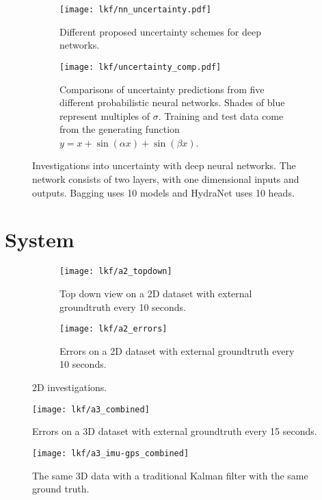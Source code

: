 \begin{figure}
    \centering
    \begin{subfigure}[]{0.9\textwidth}
    \texttt{[image: lkf/nn\_uncertainty.pdf]}
    \caption{Different proposed uncertainty schemes for deep networks.}
    \label{fig:lkf_nn_uncertainty}    
    \end{subfigure}
    
    \begin{subfigure}[]{0.9\textwidth}
    \texttt{[image: lkf/uncertainty\_comp.pdf]}
    \caption{Comparisons of uncertainty predictions from five different probabilistic neural networks. Shades of blue represent multiples of $\sigma$. Training and test data come from the generating function $y = x + \sin{(\alpha x)} + \sin{(\beta x)}$.}
	\end{subfigure}
	\label{fig:lkf_deep-uncertainty}
	\caption{Investigations into uncertainty with deep neural networks. The network consists of two layers, with one dimensional inputs and outputs. Bagging uses 10 models and HydraNet uses 10 heads.}
\end{figure}

\section{System}


\begin{figure}
    \centering
    \begin{subfigure}[]{0.9\textwidth}
    \centering
    \texttt{[image: lkf/a2\_topdown]}
	\caption{Top down view on a 2D dataset with external groundtruth every 10 seconds.}
	\label{fig:lkf_2d_topdown}    
    \end{subfigure}
    
    \begin{subfigure}[]{0.9\textwidth}
	\centering
    \texttt{[image: lkf/a2\_errors]}
	\caption{Errors on a 2D dataset with external groundtruth every 10 seconds.}
	\label{fig:lkf_2d_errors} 
		\end{subfigure}
	\label{fig:lkf_2d}
	\caption{2D investigations.}
\end{figure}


\begin{figure}
	\centering
	\texttt{[image: lkf/a3\_combined]}
	\caption{Errors on a 3D dataset with external groundtruth every 15 seconds.}
	\label{fig:lkf_system}
\end{figure}

\begin{figure}
	\centering
	\texttt{[image: lkf/a3\_imu-gps\_combined]}
	\caption{The same 3D data with a traditional Kalman filter with the same ground truth.}
	\label{fig:lkf_system}
\end{figure}



 